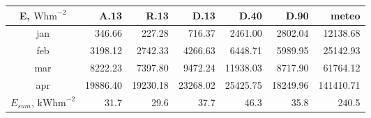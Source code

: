 \begin{tabular}{ | c | r r r r r r | } \hline
E, $\textrm{Whm}^{-2}$	&A.13	&R.13	&D.13	&D.40	&D.90	&meteo\\ \hline
jan		&346.66	&227.28	&716.37	&2461.00	&2802.04	&12138.68\\
feb		&3198.12	&2742.33	&4266.63	&6448.71	&5989.95	&25142.93\\
mar		&8222.23	&7397.80	&9472.24	&11938.03	&8717.90	&61764.12\\
apr		&19886.40	&19230.18	&23268.02	&25425.75	&18249.96	&141410.71\\ \hline
$E_{sum}$, $\textrm{kWhm}^{-2}$	&31.7	&29.6	&37.7	&46.3	&35.8	&240.5\\ \hline
\end{tabular}